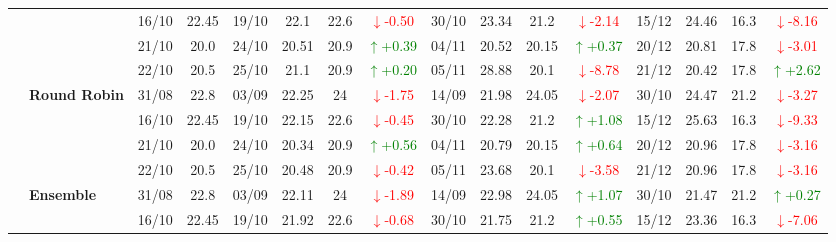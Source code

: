 {\begin{longtable}{llcc|cccc|cccc|cccc}
& 
& 16/10 & 22.45 & 19/10 & 22.1 & 22.6 & \textcolor{red}{\(\downarrow\)-0.50} & 30/10 & 23.34 & 21.2 & \textcolor{red}{\(\downarrow\)-2.14} & 15/12 & 24.46 & 16.3 & \textcolor{red}{\(\downarrow\)-8.16} \\

& 
& 21/10 & 20.0 & 24/10 & 20.51 & 20.9 & \textcolor{green}{\(\uparrow\)+0.39} & 04/11 & 20.52 & 20.15 & \textcolor{green}{\(\uparrow\)+0.37} & 20/12 & 20.81 & 17.8 & \textcolor{red}{\(\downarrow\)-3.01} \\

&
& 22/10 & 20.5 & 25/10 & 21.1 & 20.9 & \textcolor{green}{\(\uparrow\)+0.20} & 05/11 & 28.88 & 20.1 & \textcolor{red}{\(\downarrow\)-8.78} & 21/12 & 20.42 & 17.8 & \textcolor{green}{\(\uparrow\)+2.62} \\
\cmidrule(lr){2-16}


& \textbf{Round Robin}
& 31/08 & 22.8 & 03/09 & 22.25 & 24 & \textcolor{red}{\(\downarrow\)-1.75} & 14/09 & 21.98 & 24.05 & \textcolor{red}{\(\downarrow\)-2.07} & 30/10 & 24.47 & 21.2 & \textcolor{red}{\(\downarrow\)-3.27} \\

&
& 16/10 & 22.45 & 19/10 & 22.15 & 22.6 & \textcolor{red}{\(\downarrow\)-0.45} & 30/10 & 22.28 & 21.2 & \textcolor{green}{\(\uparrow\)+1.08} & 15/12 & 25.63 & 16.3 & \textcolor{red}{\(\downarrow\)-9.33} \\

&
& 21/10 & 20.0 & 24/10 & 20.34 & 20.9 & \textcolor{green}{\(\uparrow\)+0.56} & 04/11 & 20.79 & 20.15 & \textcolor{green}{\(\uparrow\)+0.64} & 20/12 & 20.96 & 17.8 & \textcolor{red}{\(\downarrow\)-3.16} \\

&
& 22/10 & 20.5 & 25/10 & 20.48 & 20.9 & \textcolor{red}{\(\downarrow\)-0.42} & 05/11 & 23.68 & 20.1 & \textcolor{red}{\(\downarrow\)-3.58} & 21/12 & 20.96 & 17.8 & \textcolor{red}{\(\downarrow\)-3.16} \\
\cmidrule(lr){2-16}


& \textbf{Ensemble}
& 31/08 & 22.8 & 03/09 & 22.11 & 24 & \textcolor{red}{\(\downarrow\)-1.89} & 14/09 & 22.98 & 24.05 & \textcolor{green}{\(\uparrow\)+1.07} & 30/10 & 21.47 & 21.2 & \textcolor{green}{\(\uparrow\)+0.27} \\

&
& 16/10 & 22.45 & 19/10 & 21.92 & 22.6 & \textcolor{red}{\(\downarrow\)-0.68} & 30/10 & 21.75 & 21.2 & \textcolor{green}{\(\uparrow\)+0.55} & 15/12 & 23.36 & 16.3 & \textcolor{red}{\(\downarrow\)-7.06} \\


\end{longtable}}
